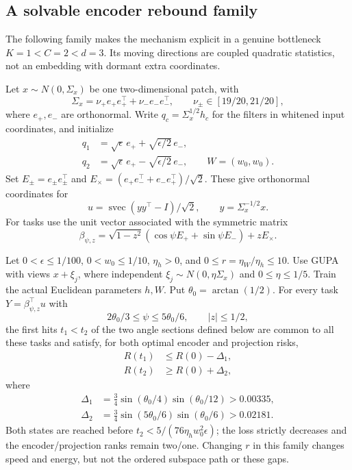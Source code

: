 \subsection{A solvable encoder rebound family}
\label{sec:bottleneck-family}
The following family makes the mechanism explicit in a genuine bottleneck $K=1<C=2<d=3$. Its moving directions are coupled quadratic statistics, not an embedding with dormant extra coordinates.

Let $x\sim N(0,\Sigma_x)$ be one two-dimensional patch, with
\begin{equation}
 \Sigma_x=\nu_+e_+e_+^\top+\nu_-e_-e_-^\top,
 \qquad \nu_\pm\in[19/20,21/20],
\end{equation}
where $e_+,e_-$ are orthonormal. Write $q_c=\Sigma_x^{1/2}h_c$ for the filters in whitened input coordinates, and initialize
\begin{align}
 q_1&=\sqrt\epsilon\,e_++\sqrt{\epsilon/2}\,e_-,\\
 q_2&=\sqrt\epsilon\,e_+-\sqrt{\epsilon/2}\,e_-,\qquad W=(w_0,w_0).
\end{align}
Set $E_\pm=e_\pm e_\pm^\top$ and $E_\times=(e_+e_-^\top+e_-e_+^\top)/\sqrt2$. These give orthonormal coordinates for
\begin{equation}
 u=\operatorname{svec}(yy^\top-I)/\sqrt2,\qquad y=\Sigma_x^{-1/2}x.
\end{equation}
For tasks use the unit vector associated with the symmetric matrix
\begin{equation}
 \beta_{\psi,z}=\sqrt{1-z^2}(\cos\psi E_++\sin\psi E_-)+zE_\times.
\end{equation}

\begin{theorem}
\label{thm:bottleneck-family}
Let $0<\epsilon\le1/100$, $0<w_0\le1/10$, $\eta_h>0$, and $0\le r=\eta_W/\eta_h\le10$. Use GUPA with views $x+\xi_j$, where independent $\xi_j\sim N(0,\eta\Sigma_x)$ and $0\le\eta\le1/5$. Train the actual Euclidean parameters $h,W$. Put $\theta_0=\arctan(1/2)$. For every task $Y=\beta_{\psi,z}^\top u$ with
\begin{equation}
 2\theta_0/3\le\psi\le5\theta_0/6,\qquad |z|\le1/2,
\end{equation}
the first hits $t_1<t_2$ of the two angle sections defined below are common to all these tasks and satisfy, for both optimal encoder and projection risks,
\begin{align}
 R(t_1)&\le R(0)-\Delta_1,\\
 R(t_2)&\ge R(0)+\Delta_2,
\end{align}
where
\begin{align}
 \Delta_1&=\tfrac34\sin(\theta_0/4)\sin(\theta_0/12)>0.00335,\\
 \Delta_2&=\tfrac34\sin(5\theta_0/6)\sin(\theta_0/6)>0.02181.
\end{align}
Both states are reached before $t_2<5/(76\eta_hw_0^2\epsilon)$; the loss strictly decreases and the encoder/projection ranks remain two/one. Changing $r$ in this family changes speed and energy, but not the ordered subspace path or these gaps.
\end{theorem}

